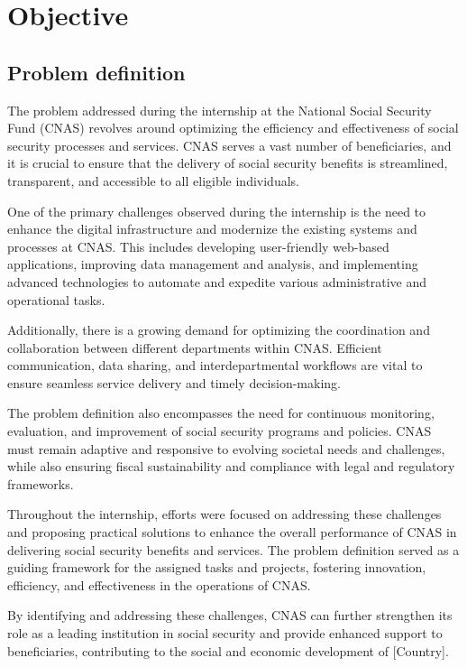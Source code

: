 \chapter{Objective}
\section{Problem definition}

The problem addressed during the internship at the National Social Security Fund (CNAS) revolves around optimizing the efficiency and effectiveness of social security processes and services. CNAS serves a vast number of beneficiaries, and it is crucial to ensure that the delivery of social security benefits is streamlined, transparent, and accessible to all eligible individuals.

One of the primary challenges observed during the internship is the need to enhance the digital infrastructure and modernize the existing systems and processes at CNAS. This includes developing user-friendly web-based applications, improving data management and analysis, and implementing advanced technologies to automate and expedite various administrative and operational tasks.

Additionally, there is a growing demand for optimizing the coordination and collaboration between different departments within CNAS. Efficient communication, data sharing, and interdepartmental workflows are vital to ensure seamless service delivery and timely decision-making.

The problem definition also encompasses the need for continuous monitoring, evaluation, and improvement of social security programs and policies. CNAS must remain adaptive and responsive to evolving societal needs and challenges, while also ensuring fiscal sustainability and compliance with legal and regulatory frameworks.

Throughout the internship, efforts were focused on addressing these challenges and proposing practical solutions to enhance the overall performance of CNAS in delivering social security benefits and services. The problem definition served as a guiding framework for the assigned tasks and projects, fostering innovation, efficiency, and effectiveness in the operations of CNAS.

By identifying and addressing these challenges, CNAS can further strengthen its role as a leading institution in social security and provide enhanced support to beneficiaries, contributing to the social and economic development of [Country].

